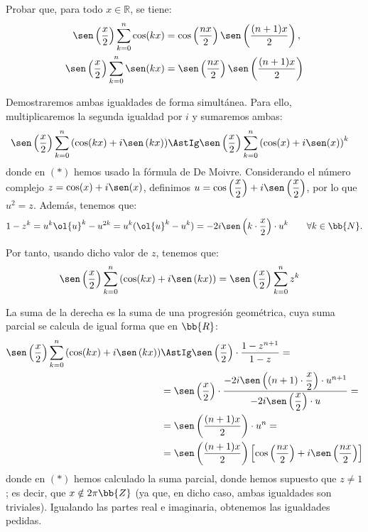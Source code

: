 \begin{ejercicio}
    Probar que, para todo $x \in \mathbb{R}$, se tiene:
    \begin{align}
        \sen\left(\frac{x}{2}\right)\sum_{k=0}^n \cos(kx) &= \cos \left(\dfrac{nx}{2}\right) \sen\left(\dfrac{(n+1)x}{2}\right), \\
        \sen\left(\frac{x}{2}\right)\sum_{k=0}^n \sen(kx) &= \sen \left(\dfrac{nx}{2}\right) \sen\left(\dfrac{(n+1)x}{2}\right)
    \end{align}

    Demostraremos ambas igualdades de forma simultánea. Para ello, multiplicaremos la segunda igualdad por $i$ y sumaremos ambas:
    \begin{align*}
        \sen\left(\frac{x}{2}\right)\sum_{k=0}^n \left(\cos(kx) + i\sen\left(kx\right)\right) &\AstIg \sen \left(\dfrac{x}{2}\right)\sum_{k=0}^n \left(\cos(x) + i\sen(x)\right)^k
    \end{align*}
    donde en $(\ast)$ hemos usado la fórmula de De Moivre. Considerando el número complejo $z=\cos(x)+i\sen(x)$, definimos $u=\cos\left(\dfrac{x}{2}\right)+i\sen\left(\dfrac{x}{2}\right)$, por lo que $u^2=z$. Además, tenemos que:
    \begin{equation*}
        1-z^k = u^k\ol{u}^k-u^{2k} = u^k(\ol{u}^k-u^k) = -2i\sen\left(k\cdot \dfrac{x}{2}\right)\cdot u^k\qquad \forall k\in \bb{N}.
    \end{equation*}

    Por tanto, usando dicho valor de $z$, tenemos que:
    \begin{align*}
        \sen\left(\frac{x}{2}\right)\sum_{k=0}^n \left(\cos(kx) + i\sen\left(kx\right)\right) &= \sen \left(\dfrac{x}{2}\right)\sum_{k=0}^n z^k
    \end{align*}
    
    La suma de la derecha es la suma de una progresión geométrica, cuya suma parcial se calcula de igual forma que en $\bb{R}$:
    \begin{align*}
        \sen\left(\frac{x}{2}\right)\sum_{k=0}^n \left(\cos(kx) + i\sen\left(kx\right)\right) &\AstIg \sen \left(\dfrac{x}{2}\right)\cdot \dfrac{1-z^{n+1}}{1-z} =\\&=
        \sen \left(\dfrac{x}{2}\right)\cdot \dfrac{-2i\sen\left((n+1)\cdot \dfrac{x}{2}\right)\cdot u^{n+1}}{-2i\sen\left(\dfrac{x}{2}\right)\cdot u}
        =\\&=\sen\left(\dfrac{(n+1)x}{2}\right)\cdot u^n
        =\\&=\sen\left(\dfrac{(n+1)x}{2}\right)\left[\cos\left(\dfrac{nx}{2}\right)+i\sen\left(\dfrac{nx}{2}\right)\right]
    \end{align*}
    donde en $(\ast)$ hemos calculado la suma parcial, donde hemos supuesto que $z\neq 1$; es decir, que $x\notin 2\pi\bb{Z}$ (ya que, en dicho caso, ambas igualdades son triviales). Igualando las partes real e imaginaria, obtenemos las igualdades pedidas.
\end{ejercicio}